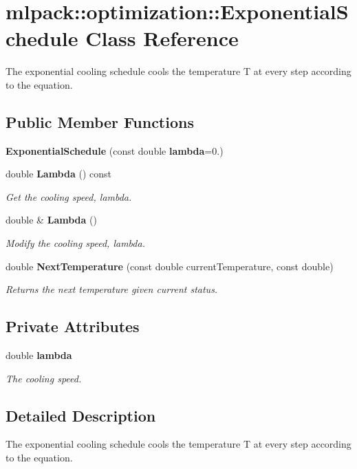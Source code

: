 \section{mlpack\-:\-:optimization\-:\-:Exponential\-Schedule Class Reference}
\label{classmlpack_1_1optimization_1_1ExponentialSchedule}


The exponential cooling schedule cools the temperature T at every step according to the equation.  


\subsection*{Public Member Functions}
\begin{DoxyCompactItemize}
\item 
{\bf Exponential\-Schedule} (const double {\bf lambda}=0.)
\item 
double {\bf Lambda} () const 
\begin{DoxyCompactList}\small\item\em Get the cooling speed, lambda. \end{DoxyCompactList}\item 
double \& {\bf Lambda} ()
\begin{DoxyCompactList}\small\item\em Modify the cooling speed, lambda. \end{DoxyCompactList}\item 
double {\bf Next\-Temperature} (const double current\-Temperature, const double)
\begin{DoxyCompactList}\small\item\em Returns the next temperature given current status. \end{DoxyCompactList}\end{DoxyCompactItemize}
\subsection*{Private Attributes}
\begin{DoxyCompactItemize}
\item 
double {\bf lambda}
\begin{DoxyCompactList}\small\item\em The cooling speed. \end{DoxyCompactList}\end{DoxyCompactItemize}


\subsection{Detailed Description}
The exponential cooling schedule cools the temperature T at every step according to the equation. 

